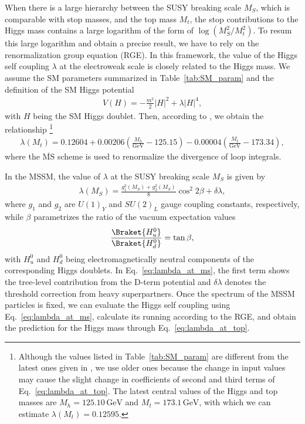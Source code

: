 \documentclass[12pt,twoside,book]{article}
\begin{document}
When there is a large hierarchy between the SUSY breaking scale $M_S$, which is comparable with stop masses, and the top mass $M_t$, the stop contributions to the Higgs mass contains a large logarithm of the form of $\log \left( M_S^2 / M_t^2 \right)$.
To resum this large logarithm and obtain a precise result, we have to rely on the renormalization group equation (RGE).
In this framework, the value of the Higgs self coupling $\lambda$ at the electroweak scale is closely related to the Higgs mass.
We assume the SM parameters summarized in Table~\ref{tab:SM_param} and the definition of the SM Higgs potential
\begin{align}
  V(H) = -\frac{m^2}{2} |H|^2 + \lambda |H|^4,
\end{align}
with $H$ being the SM Higgs doublet.
Then, according to \cite{Buttazzo:2013uya}, we obtain the relationship
\footnote{
  Although the values listed in Table~\ref{tab:SM_param} are different from the latest ones given in \cite{Tanabashi:2018oca}, we use older ones because the change in input values may cause the slight change in coefficients of second and third terms of Eq.~\eqref{eq:lambda_at_top}.
  The latest central values of the Higgs and top masses are $M_h = 125.10\,\mathrm{GeV}$ and $M_t = 173.1\,\mathrm{GeV}$, with which we can estimate $\lambda (M_t) = 0.12595$.
}
\begin{align}
  \lambda (M_t) = 0.12604
  + 0.00206 \left( \frac{M_h}{\mathrm{GeV}} - 125.15 \right)
  - 0.00004 \left( \frac{M_t}{\mathrm{GeV}} - 173.34 \right),
  \label{eq:lambda_at_top}
\end{align}
where the $\overline{\mathrm{MS}}$ scheme is used to renormalize the divergence of loop integrals.

In the MSSM, the value of $\lambda$ at the SUSY breaking scale $M_S$ is given by
\begin{align}
  \lambda (M_S) = \frac{g_1^2 (M_S) + g_2^2 (M_S)}{8} \cos^2 2\beta + \delta \lambda,
  \label{eq:lambda_at_ms}
\end{align}
where $g_1$ and $g_2$ are $U(1)_Y$ and $SU(2)_L$ gauge coupling constants, respectively, while $\beta$ parametrizes the ratio of the vacuum expectation values
\begin{align}
  \frac{\Braket{H_u^0}}{\Braket{H_d^0}} = \tan \beta,
\end{align}
with $H_u^0$ and $H_d^0$ being electromagnetically neutral components of the corresponding Higgs doublets.
In Eq.~\eqref{eq:lambda_at_ms}, the first term shows the tree-level contribution from the D-term potential and $\delta \lambda$ denotes the threshold correction from heavy superpartners.
Once the spectrum of the MSSM particles is fixed, we can evaluate the Higgs self coupling using Eq.~\eqref{eq:lambda_at_ms}, calculate its running according to the RGE, and obtain the prediction for the Higgs mass through Eq.~\eqref{eq:lambda_at_top}.
\end{document}
